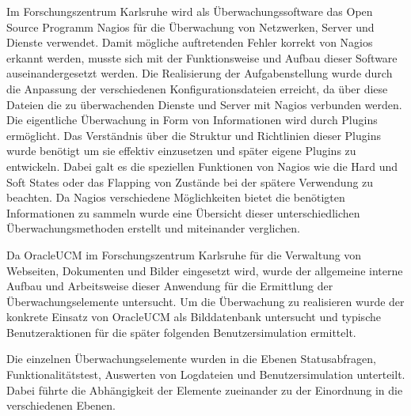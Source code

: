 Im Forschungszentrum Karlsruhe wird als Überwachungssoftware das Open Source Programm Nagios für die Überwachung von Netzwerken, Server und Dienste verwendet.
Damit mögliche auftretenden Fehler korrekt von Nagios erkannt werden, musste sich mit der Funktionsweise und Aufbau dieser Software auseinandergesetzt werden.
Die Realisierung der Aufgabenstellung wurde durch die Anpassung der verschiedenen Konfigurationsdateien erreicht, da über diese Dateien die zu überwachenden Dienste und Server mit Nagios verbunden werden.
Die eigentliche Überwachung in Form von Informationen wird durch Plugins ermöglicht.
Das Verständnis über die Struktur und Richtlinien dieser Plugins wurde benötigt um sie effektiv einzusetzen und später eigene Plugins zu entwickeln.
Dabei galt es die speziellen Funktionen von Nagios wie die Hard und Soft States oder das Flapping von Zustände bei der spätere Verwendung zu beachten.
Da Nagios verschiedene Möglichkeiten bietet die benötigten Informationen zu sammeln wurde eine Übersicht dieser unterschiedlichen Überwachungsmethoden erstellt und miteinander verglichen.

Da \gls{OracleUCM} im Forschungszentrum Karlsruhe für die Verwaltung von Webseiten, Dokumenten und Bilder eingesetzt wird, wurde der allgemeine interne Aufbau und Arbeitsweise dieser Anwendung für die Ermittlung der Überwachungselemente untersucht.
Um die Überwachung zu realisieren wurde der konkrete Einsatz von \gls{OracleUCM} als Bilddatenbank untersucht und typische Benutzeraktionen für die später folgenden Benutzersimulation ermittelt.

Die einzelnen Überwachungselemente wurden in die Ebenen Statusabfragen, Funktionalitätstest, Auswerten von Logdateien und Benutzersimulation unterteilt.
Dabei führte die Abhängigkeit der Elemente zueinander zu der Einordnung in die verschiedenen Ebenen.

